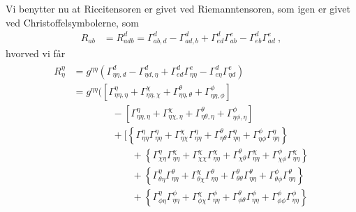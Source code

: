 \documentclass[../main.tex]{subfiles}
\begin{document}
Vi benytter nu at Riccitensoren er givet ved Riemanntensoren, som igen er givet ved Christoffelsymbolerne, som
\begin{align}
    R_{ab} &= R^d_{adb}
        = \Gamma^d_{ab,d} - \Gamma^d_{ad,b} + \Gamma^d_{ed} \Gamma^e_{ab} - \Gamma^d_{eb} \Gamma^e_{ad} \: ,
\end{align}
hvorved vi får
\begin{subequations}
\begin{align}
    \begin{split}
        R^\eta_\eta %
        &= g^{\eta \eta} \left(\Gamma^d_{\eta\eta,d} - \Gamma^d_{\eta d,\eta} + \Gamma^d_{ed} \Gamma^e_{\eta\eta} - \Gamma^d_{e\eta} \Gamma^e_{\eta d} \right) \\
        &= g^{\eta \eta} \bigg(
            \left[ \Gamma^\eta_{\eta\eta,\eta} + \Gamma^\chi_{\eta\eta,\chi} + \Gamma^\theta_{\eta\eta,\theta} + \Gamma^\phi_{\eta\eta,\phi} \right] \\
            &\qquad\qquad - \left[ \Gamma^\eta_{\eta \eta,\eta} + \Gamma^\chi_{\eta \chi,\eta} + \Gamma^\theta_{\eta \theta,\eta} + \Gamma^\phi_{\eta \phi,\eta} \right] \\
            &\qquad\qquad + \Big[ \left\{ \Gamma^\eta_{\eta\eta} \Gamma^\eta_{\eta\eta} + \Gamma^\chi_{\eta\chi} \Gamma^\eta_{\eta\eta} + \Gamma^\theta_{\eta\theta} \Gamma^\eta_{\eta\eta} + \Gamma^\phi_{\eta\phi} \Gamma^\eta_{\eta\eta} \right\} \\
                &\qquad\qquad\qquad + \left\{ \Gamma^\eta_{\chi\eta} \Gamma^\chi_{\eta\eta} + \Gamma^\chi_{\chi\chi} \Gamma^\chi_{\eta\eta} + \Gamma^\theta_{\chi\theta} \Gamma^\chi_{\eta\eta} + \Gamma^\phi_{\chi\phi} \Gamma^\chi_{\eta\eta} \right\} \\
                &\qquad\qquad\qquad + \left\{ \Gamma^\eta_{\theta\eta} \Gamma^\theta_{\eta\eta} + \Gamma^\chi_{\theta\chi} \Gamma^\theta_{\eta\eta} + \Gamma^\theta_{\theta\theta} \Gamma^\theta_{\eta\eta} + \Gamma^\phi_{\theta\phi} \Gamma^\theta_{\eta\eta} \right\} \\
                &\qquad\qquad\qquad + \left\{ \Gamma^\eta_{\phi\eta} \Gamma^\phi_{\eta\eta} + \Gamma^\chi_{\phi\chi} \Gamma^\phi_{\eta\eta} + \Gamma^\theta_{\phi\theta} \Gamma^\phi_{\eta\eta} + \Gamma^\phi_{\phi\phi} \Gamma^\phi_{\eta\eta} \right\}

\end{split}
\end{align}
\end{subequations}
\end{document}
